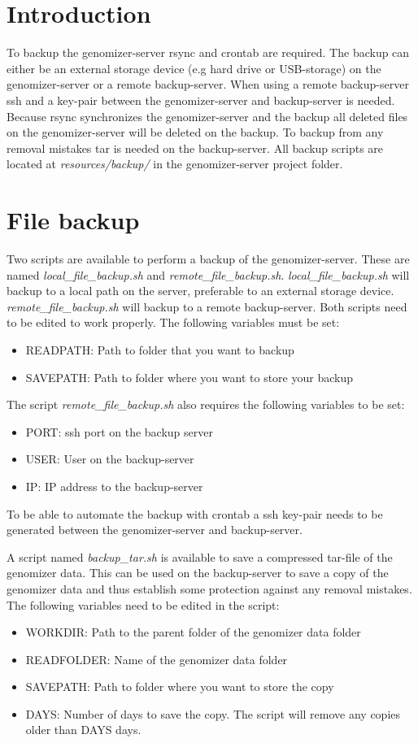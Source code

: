 \section{Introduction}
To backup the genomizer-server rsync and crontab are required. The backup can either be an external storage device (e.g hard drive or USB-storage) on the genomizer-server or a remote backup-server. When using a remote backup-server ssh and a key-pair between the genomizer-server and backup-server is needed. Because rsync synchronizes the genomizer-server and the backup all deleted files on the genomizer-server will be deleted on the backup. To backup from any removal mistakes tar is needed on the backup-server. All backup scripts are located at \emph{resources/backup/} in the genomizer-server project folder.

\section{File backup}
Two scripts are available to perform a backup of the genomizer-server. These are named \emph{local\_file\_backup.sh} and \emph{remote\_file\_backup.sh}.
\emph{local\_file\_backup.sh} will backup to a local path on the server, preferable to an external storage device. \emph{remote\_file\_backup.sh} will backup to a remote backup-server. Both scripts need to be edited to work properly. The following variables must be set:
\begin{itemize}
\item READPATH: Path to folder that you want to backup
\item SAVEPATH: Path to folder where you want to store your backup
\end{itemize}
The script \emph{remote\_file\_backup.sh} also requires the following variables to be set:
\begin{itemize}
\item PORT: ssh port on the backup server
\item USER: User on the backup-server
\item IP: IP address to the backup-server
\end{itemize}
To be able to automate the backup with crontab a ssh key-pair needs to be generated between the genomizer-server and backup-server. 

A script named \emph{backup\_tar.sh} is available to save a compressed tar-file of the genomizer data. This can be used on the backup-server to save a copy of the genomizer data and thus establish some protection against any removal mistakes. The following variables need to be edited in the script:
\begin{itemize}
\item WORKDIR: Path to the parent folder of the genomizer data folder
\item READFOLDER: Name of the genomizer data folder
\item SAVEPATH: Path to folder where you want to store the copy
\item DAYS: Number of days to save the copy. The script will remove any copies older than DAYS days.
\end{itemize}

